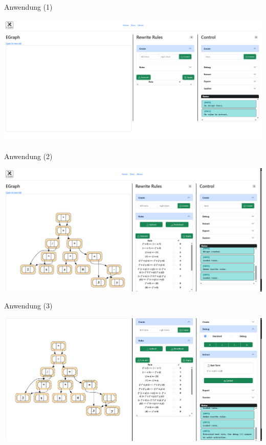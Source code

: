 \begin{frame}{Anwendung (1)}
    \begin{center}
        \includegraphics[scale=0.3]{utils/anwendung/anwendung1.png}
    \end{center}
\end{frame}

\begin{frame}{Anwendung (2)}
    \begin{center}
        \includegraphics[scale=0.3]{utils/anwendung/anwendung2.png}
    \end{center}
\end{frame}

\begin{frame}{Anwendung (3)}
    \begin{center}
        \includegraphics[scale=0.3]{utils/anwendung/anwendung3.png}
    \end{center}
\end{frame}

